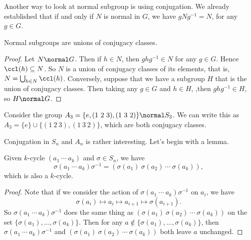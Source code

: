 \documentclass[a4paper]{scrartcl}
\begin{document}
Another way to look at normal subgroup is using conjugation. We already established that if and only if $N$ is normal in $G$, we have $g N g^{-1} = N$, for any $g \in G$.

\begin{proposition}
	Normal subgroups are unions of conjugacy classes.
\end{proposition}
\begin{proof}
	Let $N \normal G$. Then if $h \in N$, then $ghg^{-1} \in N$ for any $g \in G$. Hence $\ccl(h) \subseteq N$.
	So $N$ is a union of conjugacy classes of its elements, that is, $N = \bigcup_{h \in N} \ccl(h)$.
	Conversely, suppose that we have a subgroup $H$ that is the union of conjugacy classes. Then taking any $g \in G$ and $h \in H$, ,then $ghg^{-1} \in H$, so $H \normal G$.
\end{proof}

\begin{example}
	Consider the group $A_3 = \{e, (1\ 2\ 3), (1\ 3\ 2)\} \normal S_3$. We can write this as $A_3 = \{e\} \cup \{(1\ 2\ 3), (1\ 3\ 2)\}$, which are both conjugacy classes.
\end{example}

Conjugation in $S_n$ and $A_n$ is rather interesting. Let's begin with a lemma.

\begin{lemma}
	Given $k$-cycle $(a_1\ \cdots\ a_k)$ and $\sigma \in S_n$, we have
	$$
	\sigma (a_1 \ \cdots\ a_k) \sigma^{-1} = (\sigma(a_1)\ \sigma(a_2)\ \cdots \ \sigma(a_k)),
	$$
	which is also a $k$-cycle.
\end{lemma}
\begin{proof}
	Note that if we consider the action of $\sigma (a_1 \ \cdots\ a_k) \sigma^{-1}$ on $a_i$, we have
	$$
	\sigma(a_i) \mapsto a_{i} \mapsto a_{i + 1} \mapsto \sigma(a_{i + 1}).
	$$
	So $\sigma (a_1 \ \cdots\ a_k) \sigma^{-1}$ does the same thing as $(\sigma(a_1)\ \sigma(a_2)\ \cdots \ \sigma(a_k))$ on the set $\{\sigma(a_1), \dots, \sigma(a_k)\}$.  Then for any $a \not \in \{\sigma(a_1), \dots, \sigma(a_k)\}$, then $\sigma (a_1 \ \cdots\ a_k) \sigma^{-1}$ and  $(\sigma(a_1)\ \sigma(a_2)\ \cdots \ \sigma(a_k))$ both leave $a$ unchanged.
\end{proof}
\end{document}
